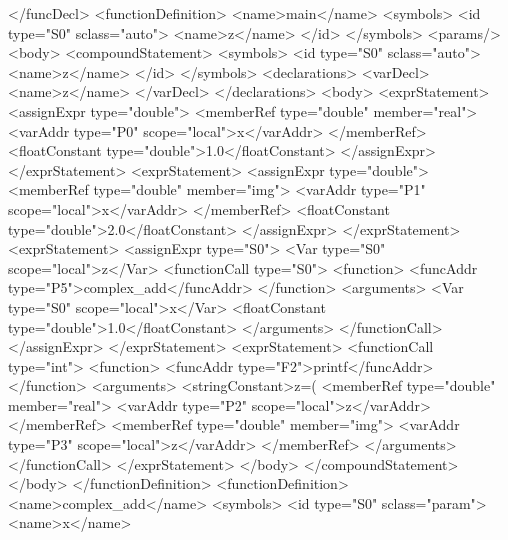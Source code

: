 \begin{XcodeMLExample}
    </funcDecl>
    <functionDefinition>
      <name>main</name>
      <symbols>
        <id type="S0" sclass="auto">
          <name>z</name>
        </id>
      </symbols>
      <params/>
      <body>
        <compoundStatement>
          <symbols>
            <id type="S0" sclass="auto">
              <name>z</name>
            </id>
          </symbols>
          <declarations>
            <varDecl>
              <name>z</name>
            </varDecl>
          </declarations>
          <body>
            <exprStatement>
              <assignExpr type="double">
                <memberRef type="double" member="real">
                  <varAddr type="P0" scope="local">x</varAddr>
                </memberRef>
                <floatConstant type="double">1.0</floatConstant>
              </assignExpr>
            </exprStatement>
            <exprStatement>
              <assignExpr type="double">
                <memberRef type="double" member="img">
                  <varAddr type="P1" scope="local">x</varAddr>
                </memberRef>
                <floatConstant type="double">2.0</floatConstant>
              </assignExpr>
            </exprStatement>
            <exprStatement>
              <assignExpr type="S0">
                <Var type="S0" scope="local">z</Var>
                <functionCall type="S0">
                  <function>
                    <funcAddr type="P5">complex_add</funcAddr>
                  </function>
                  <arguments>
                    <Var type="S0" scope="local">x</Var>
                    <floatConstant type="double">1.0</floatConstant>
                  </arguments>
                </functionCall>
              </assignExpr>
            </exprStatement>
            <exprStatement>
              <functionCall type="int">
                <function>
                  <funcAddr type="F2">printf</funcAddr>
                </function>
                <arguments>
                  <stringConstant>z=(%
                  <memberRef type="double" member="real">
                    <varAddr type="P2" scope="local">z</varAddr>
                  </memberRef>
                  <memberRef type="double" member="img">
                    <varAddr type="P3" scope="local">z</varAddr>
                  </memberRef>
                </arguments>
              </functionCall>
            </exprStatement>
          </body>
        </compoundStatement>
      </body>
    </functionDefinition>
    <functionDefinition>
      <name>complex_add</name>
      <symbols>
        <id type="S0" sclass="param">
          <name>x</name>

\end{XcodeMLExample}

